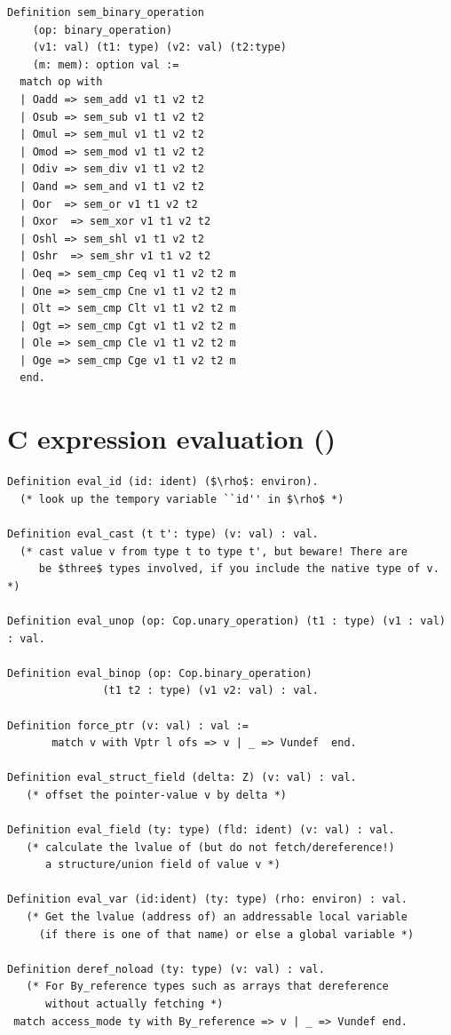 \documentclass[12pt,fleqn,openany,oneside,showtrims]{memoir}
\newcommand{\ychapter}[2]{\chapter[#1]{#1 \hfill \normalsize #2}}
\begin{document}
\begin{lstlisting}
Definition sem_binary_operation
    (op: binary_operation)
    (v1: val) (t1: type) (v2: val) (t2:type)
    (m: mem): option val :=
  match op with
  | Oadd => sem_add v1 t1 v2 t2
  | Osub => sem_sub v1 t1 v2 t2 
  | Omul => sem_mul v1 t1 v2 t2
  | Omod => sem_mod v1 t1 v2 t2
  | Odiv => sem_div v1 t1 v2 t2 
  | Oand => sem_and v1 t1 v2 t2
  | Oor  => sem_or v1 t1 v2 t2
  | Oxor  => sem_xor v1 t1 v2 t2
  | Oshl => sem_shl v1 t1 v2 t2
  | Oshr  => sem_shr v1 t1 v2 t2   
  | Oeq => sem_cmp Ceq v1 t1 v2 t2 m
  | One => sem_cmp Cne v1 t1 v2 t2 m
  | Olt => sem_cmp Clt v1 t1 v2 t2 m
  | Ogt => sem_cmp Cgt v1 t1 v2 t2 m
  | Ole => sem_cmp Cle v1 t1 v2 t2 m
  | Oge => sem_cmp Cge v1 t1 v2 t2 m
  end.
\end{lstlisting}

\ychapter{C expression evaluation}{()}

\begin{lstlisting}
Definition eval_id (id: ident) ($\rho$: environ).
  (* look up the tempory variable ``id'' in $\rho$ *)

Definition eval_cast (t t': type) (v: val) : val.
  (* cast value v from type t to type t', but beware! There are
     be $three$ types involved, if you include the native type of v. *)

Definition eval_unop (op: Cop.unary_operation) (t1 : type) (v1 : val) : val.

Definition eval_binop (op: Cop.binary_operation) 
               (t1 t2 : type) (v1 v2: val) : val.

Definition force_ptr (v: val) : val :=
       match v with Vptr l ofs => v | _ => Vundef  end.

Definition eval_struct_field (delta: Z) (v: val) : val.
   (* offset the pointer-value v by delta *)

Definition eval_field (ty: type) (fld: ident) (v: val) : val.
   (* calculate the lvalue of (but do not fetch/dereference!)
      a structure/union field of value v *)

Definition eval_var (id:ident) (ty: type) (rho: environ) : val.
   (* Get the lvalue (address of) an addressable local variable
     (if there is one of that name) or else a global variable *)

Definition deref_noload (ty: type) (v: val) : val.
   (* For By_reference types such as arrays that dereference
      without actually fetching *)
 match access_mode ty with By_reference => v | _ => Vundef end.
\end{lstlisting}
\end{document}

